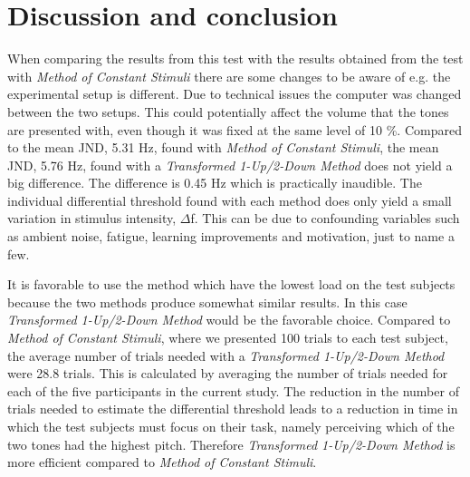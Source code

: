 \section*{Discussion and conclusion}
%
When comparing the results from this test with the results obtained from the test with \textit{Method of Constant Stimuli} there are some changes to be aware of e.g. the experimental setup is different. Due to technical issues the computer was changed between the two setups. This could potentially affect the volume that the tones are presented with, even though it was fixed at the same level of 10 \%. \blankline
%
Compared to the mean JND, 5.31 Hz, found with \textit{Method of Constant Stimuli}, the mean JND, 5.76 Hz, found with a \textit{Transformed 1-Up/2-Down Method} does not yield a big difference. The difference is 0.45 Hz which is practically inaudible. The individual differential threshold found with each method does only yield a small variation in stimulus intensity, $\Delta$f. This can be due to confounding variables such as ambient noise, fatigue, learning improvements and motivation, just to name a few.  

It is favorable to use the method which have the lowest load on the test subjects because the two methods produce somewhat similar results. In this case \textit{Transformed 1-Up/2-Down Method} would be the favorable choice. Compared to \textit{Method of Constant Stimuli}, where we presented 100 trials to each test subject, the average number of trials needed with a \textit{Transformed 1-Up/2-Down Method} were 28.8 trials. This is calculated by averaging the number of trials needed for each of the five participants in the current study. The reduction in the number of trials needed to estimate the differential threshold leads to a reduction in time in which the test subjects must focus on their task, namely perceiving which of the two tones had the highest pitch. Therefore \textit{Transformed 1-Up/2-Down Method}  is more efficient compared to \textit{Method of Constant Stimuli}.

